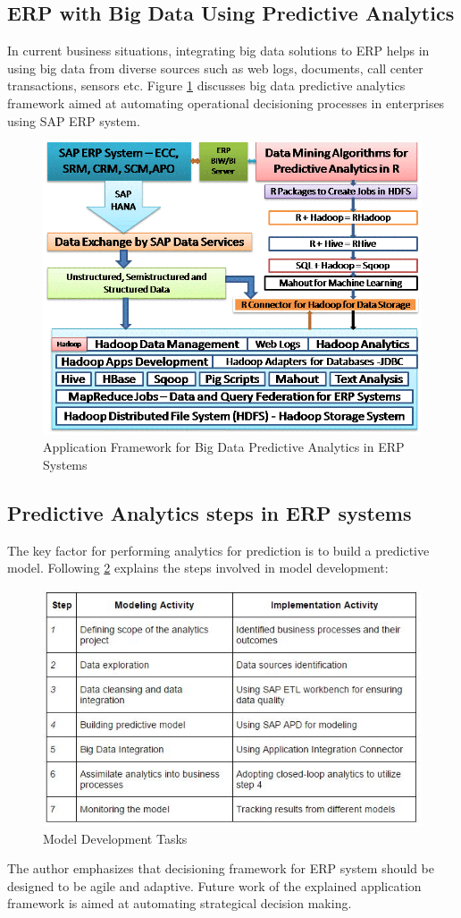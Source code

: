 \documentclass[runningheads]{llncs}
\begin{document}
\subsection{ERP with Big Data Using Predictive Analytics}
In current business situations, integrating \cite{2} big data solutions to ERP helps in using big data from diverse sources such as web logs, documents, call center transactions, sensors etc.
Figure \ref{fig:figure10} discusses big data predictive analytics framework aimed at automating operational decisioning processes in enterprises using SAP ERP system.
\begin{figure}
	\centering
	\includegraphics[width=0.7\linewidth]{Figure12}
	\caption{Application Framework for Big Data Predictive Analytics in ERP Systems \cite{2}}
	\label{fig:figure10}
\end{figure}

\subsection{Predictive Analytics steps in ERP systems}
The key factor for performing analytics for prediction is to build a predictive model. Following \ref{fig:figure11} explains the steps involved in model development: 
\begin{figure}
	\centering
	\includegraphics[width=0.7\linewidth]{Figure12.jpg}
	\caption{Model Development Tasks}
	\label{fig:figure11}
\end{figure}
The author emphasizes that decisioning framework for ERP system should be designed to be agile and adaptive. Future work of the explained application framework  is aimed at automating strategical decision making.
\end{document}
